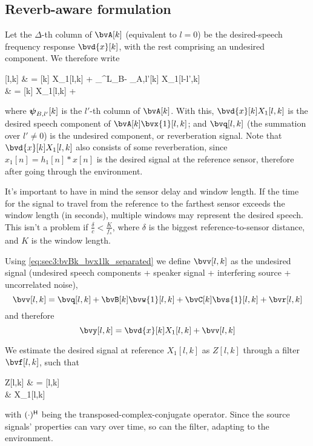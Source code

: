 \subsection{Reverb-aware formulation}\label{subsec:sec3:reverb-rejecting_formulation}
Let the $\Delta$-th column of $\bvA[k]$ (equivalent to $l=0$) be the desired-speech frequency response $\bvd{x}[k]$, with the rest comprising an undesired component. We therefore write
\begin{equations}
	\label{eq:sec3:bvBk_bvx1lk_separated}
	\bvA[k] [l,k]
	& =  X_1[l,k] + \sum_{}^{L_B-} \bvpsi_{A,l'}[k] X_1[l-l',k] \\
	& =  X_1[l,k] + \bvq[l,k]
\end{equations}
where $\boldsymbol{\psi}_{B,l'}[k]$ is the $l'$-th column of $\bvA[k]$. With this, $\bvd{x}[k] X_1[l,k]$ is the desired speech component of $\bvA[k] \bvx{1}[l,k]$; and $\bvq[l,k]$ (the summation over $l' \neq 0$) is the undesired component, or reverberation signal. Note that $\bvd{x}[k] X_1[l,k]$ also consists of some reverberation, since $x_1[n] = h_1[n] \ast x[n]$ is the desired signal at the reference sensor, therefore after going through the environment.

It's important to have in mind the sensor delay and window length. If the time for the signal to travel from the reference to the farthest sensor exceeds the window length (in seconds), multiple windows may represent the desired speech. This isn't a problem if $\frac{\delta}{c} < \frac{K}{f_s}$, where $\delta$ is the biggest reference-to-sensor distance, and $K$ is the window length.

Using \cref{eq:sec3:bvBk_bvx1lk_separated} we define $\bvv[l,k]$ as the undesired signal (undesired speech components + speaker signal + interfering source + uncorrelated noise),
\begin{equation}
	\label{eq:sec3:def_undes_sig_bvwlk}
	\bvv[l,k] = \bvq[l,k] + \bvB[k] \bvw{1}[l,k] + \bvC[k] \bvs{1}[l,k] + \bvr[l,k]
\end{equation}
and therefore
\begin{equation}
	\label{eq:sec3:time-freq_model_final}
	\bvy[l,k] = \bvd{x}[k] X_1[l,k] + \bvv[l,k]
\end{equation}

We estimate the desired signal at reference $X_1[l,k]$ as $Z[l,k]$ through a filter $\bvf[l,k]$, such that
\begin{equations}
	Z[l,k]
	& = \he{\bvf}[l,k] \bvy[l,k] \\
	& \approx X_1[l,k]
\end{equations}
with $(\cdot)^{\mathsf{H}}$ being the transposed-complex-conjugate operator. Since the source signals' properties can vary over time, so can the filter, adapting to the environment.

